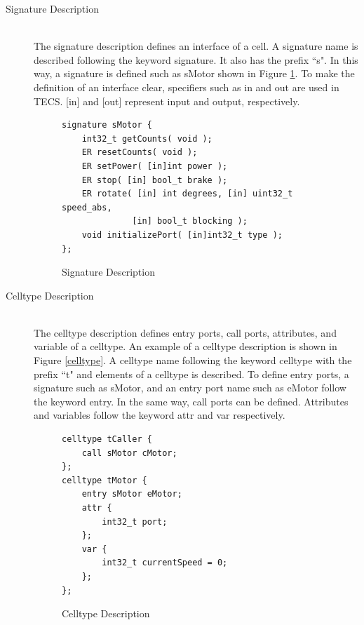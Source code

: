 \documentclass{sig-alternate-05-2015}
\begin{document}
\begin{description}
    \item[{\mybf Signature Description}]\mbox{}\\
        The {\myit signature} description defines an interface of a {\myit cell}.
        A {\myit signature} name is described following the keyword {\myit signature}.
        It also has the prefix ``s".
        In this way, a {\myit signature} is defined such as sMotor shown in Figure \ref{signature}.
        To make the definition of an interface clear, specifiers such as in and out are used in TECS.
        [in] and [out] represent input and output, respectively.
\begin{figure}[t]
\centering
\begin{lstlisting}
signature sMotor {
    int32_t getCounts( void );
    ER resetCounts( void );
    ER setPower( [in]int power );
    ER stop( [in] bool_t brake );
    ER rotate( [in] int degrees, [in] uint32_t speed_abs,
              [in] bool_t blocking );
    void initializePort( [in]int32_t type );
};
\end{lstlisting}
\vspace{1mm}
\caption{Signature Description}
\vspace{1mm}
\label{signature}
\end{figure}
    \item[{\mybf Celltype Description}]\mbox{}\\
        The {\myit celltype} description defines {\myit entry} ports, {\myit call} ports, attributes, and variable of a {\myit celltype}.
        An example of a {\myit celltype} description is shown in Figure \ref{celltype}.
        A {\myit celltype} name following the keyword {\myit celltype} with the prefix ``t" and elements of a {\myit celltype} is described.
        To define {\myit entry} ports, a {\myit signature} such as sMotor, and an {\myit entry} port name such as eMotor follow the keyword {\myit entry}.
        In the same way, {\myit call} ports can be defined.
        Attributes and variables follow the keyword {\myit attr} and {\myit var} respectively.
\begin{figure}[t]
\centering
\begin{lstlisting}
celltype tCaller {
    call sMotor cMotor;
};
celltype tMotor {
    entry sMotor eMotor;
    attr {
        int32_t port;
    };
    var {
        int32_t currentSpeed = 0;
    };
};
\end{lstlisting}
\vspace{1mm}
\caption{Celltype Description}

\end{figure}
\end{description}
\end{document}
